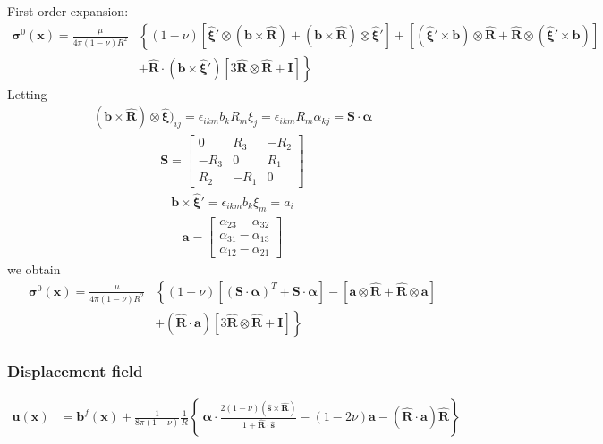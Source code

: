 \documentclass[10pt]{report}
\begin{document}
{First order expansion:
\begin{align}
\bm\sigma^0(\bm x)=\frac{\mu}{4\pi(1-\nu)R^2}&\left\{
(1-\nu)\left[\hat{\bm\xi}'\otimes(\bm b\times\hat{\bm R})+(\bm b\times\hat{\bm R})\otimes\hat{\bm\xi}'\right] 
+\left[(\hat{\bm \xi}'\times\bm b)\otimes\hat{\bm R}+\hat{\bm R}\otimes(\hat{\bm \xi}'\times\bm b)\right] \right. \nonumber\\
&\left.+\hat{\bm R}\cdot(\bm b\times\hat{\bm\xi}')\left[3\hat{\bm R}\otimes\hat{\bm R}+\bm I \right]
\right\}
\end{align}
Letting
\begin{align}
(\bm b\times\hat{\bm R})\otimes\hat{\bm\xi})_{ij}=\epsilon_{ikm}b_kR_m\xi_j=\epsilon_{ikm}R_m\alpha_{kj}=\mathbf{S}\cdot\mathbf{\alpha}
\end{align}
\begin{align}
\mathbf{S}=\left[\begin{array}{ccc}
0&R_3&-R_2\\
-R_3&0&R_1\\
R_2&-R_1&0
\end{array}\right]
\end{align}
\begin{align}
\bm b\times\hat{\bm \xi}'=\epsilon_{ikm}b_k\xi_m=a_i
\end{align}
\begin{align}
\mathbf{a}=\left[\begin{array}{c}
\alpha_{23}-\alpha_{32}\\
\alpha_{31}-\alpha_{13}\\
\alpha_{12}-\alpha_{21}
\end{array}\right]
\end{align}
we obtain
\begin{align}
\bm\sigma^0(\bm x)=\frac{\mu}{4\pi(1-\nu)R^2}&\left\{
(1-\nu)\left[(\mathbf{S}\cdot\mathbf{\alpha})^T+\mathbf{S}\cdot\mathbf{\alpha}\right] 
-\left[\mathbf{a}\otimes\hat{\bm R}+\hat{\bm R}\otimes\mathbf{a}\right] \right. \nonumber\\
&\left.+(\hat{\bm R}\cdot\bm a)\left[3\hat{\bm R}\otimes\hat{\bm R}+\bm I \right]
\right\}
\end{align}

\subsubsection{Displacement field}
\begin{align}
 \mathbf{u}(\mathbf x)
&=\mathbf{b}^f(\mathbf x)
+\frac{1}{8\pi(1-\nu)}  \frac{1}{R}
\left\{\ \bm\alpha\cdot\frac{2(1-\nu)(\hat{\mathbf{s}}\times\hat{\mathbf{R}})}{1+\hat{\mathbf{R}}\cdot\hat{\mathbf{s}}}
- \left(1-2\nu\right) \bm a
- \left(\hat{\mathbf{ R}}\cdot\bm a \right)\hat{\mathbf{ R}}  \right\}
\end{align}

}
\end{document}
